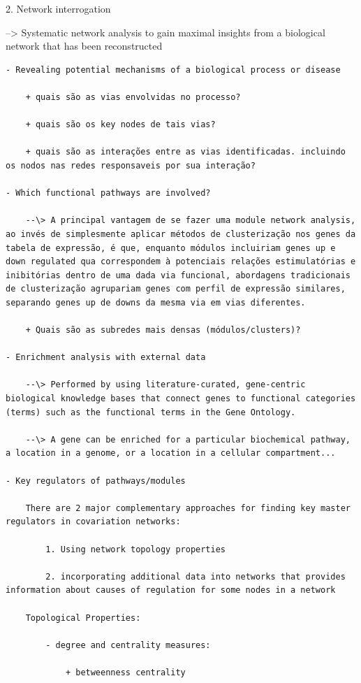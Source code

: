\documentclass[
]{book}
\begin{document}
2. Network interrogation

--\textgreater{} Systematic network analysis to gain maximal insights from a biological network that has been reconstructed

\begin{verbatim}
- Revealing potential mechanisms of a biological process or disease

    + quais são as vias envolvidas no processo?

    + quais são os key nodes de tais vias?

    + quais são as interações entre as vias identificadas. incluindo os nodos nas redes responsaveis por sua interação?

- Which functional pathways are involved?

    --\> A principal vantagem de se fazer uma module network analysis, ao invés de simplesmente aplicar métodos de clusterização nos genes da tabela de expressão, é que, enquanto módulos incluiriam genes up e down regulated qua correspondem à potenciais relações estimulatórias e inibitórias dentro de uma dada via funcional, abordagens tradicionais de clusterização agrupariam genes com perfil de expressão similares, separando genes up de downs da mesma via em vias diferentes.

    + Quais são as subredes mais densas (módulos/clusters)?

- Enrichment analysis with external data

    --\> Performed by using literature-curated, gene-centric biological knowledge bases that connect genes to functional categories (terms) such as the functional terms in the Gene Ontology.

    --\> A gene can be enriched for a particular biochemical pathway, a location in a genome, or a location in a cellular compartment...

- Key regulators of pathways/modules

    There are 2 major complementary approaches for finding key master regulators in covariation networks:

        1. Using network topology properties

        2. incorporating additional data into networks that provides information about causes of regulation for some nodes in a network

    Topological Properties:

        - degree and centrality measures:

            + betweenness centrality


\end{verbatim}
\end{document}
